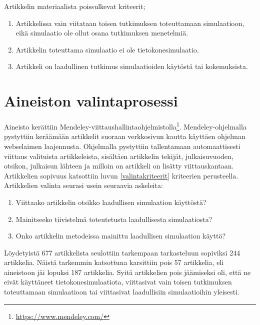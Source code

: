 \documentclass[utf8]{gradu3}
\begin{document}
Artikkelin materiaalista poissulkevat kriteerit;
\begin{enumerate}
    \item Artikkelissa vain viitataan toisen tutkimuksen toteuttamaan simulaatioon, eikä simulaatio ole ollut osana tutkimuksen menetelmiä.
    \item Artikkelin toteuttama simulaatio ei ole tietokonesimulaatio.
    \item Artikkeli on laadullinen tutkimus simulaatioiden käytöstä tai kokemuksista.
\end{enumerate}

\section{Aineiston valintaprosessi} \label{valintaprosessi}
Aineisto kerättiin Mendeley-viittaushallintaohjelmistolla\footnote{\url{https://www.mendeley.com/}}. Mendeley-ohjelmalla pystyttiin keräämään artikkelit suoraan verkkosivun kautta käyttäen ohjelman webselaimen laajennusta. Ohjelmalla pystyttiin tallentamaan automaattisesti viittaus valituista artikkeleista, sisältäen artikkelin tekijät, julkaisuvuoden, otsikon, julkaisun lähteen ja milloin on artikkeli on lisätty viittauskantaan. Artikkelien sopivuus katsottiin luvun \ref{valintakriteerit} kriteerien perusteella. Artikkelien valinta seurasi usein seuraavia askeleita:

\begin{enumerate}
    \item Viittaako artikkelin otsikko laadullisen simulaation käyttöstä?
    \item Mainitseeko tiivistelmä toteutetusta laadullisesta simulaatiosta?
    \item Onko artikkelin metodeissa mainittu laadullisen simulaation käyttö?
\end{enumerate}

Löydetyistä 677 artikkelista seulottiin tarkempaan tarkasteluun 
sopiviksi 244 artikkelia. Näistä tarkemmin katsottuna karsittiin pois 57 artikkelia, 
eli aineistoon jäi lopuksi 187 artikkelia. Syitä artikkelien pois jäämiseksi oli, 
että ne eivät käyttäneet tietokonesimulaatiota, 
viittasivat vain toisen tutkimuksen toteuttamaan simulaatioon tai
viittasivat laadullisiin simulaatioihin yleisesti.
\end{document}

